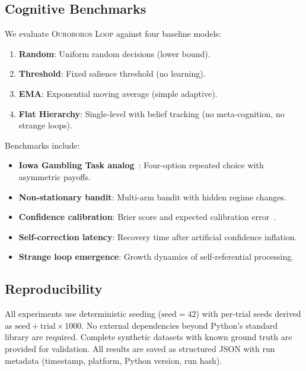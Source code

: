 \documentclass[11pt,a4paper]{article}
\newcommand{\OL}{\textsc{Ouroboros Loop}}
\begin{document}
\subsection{Cognitive Benchmarks}

We evaluate \OL{} against four baseline models:

\begin{enumerate}
  \item \textbf{Random}: Uniform random decisions (lower bound).
  \item \textbf{Threshold}: Fixed salience threshold (no learning).
  \item \textbf{EMA}: Exponential moving average (simple adaptive).
  \item \textbf{Flat Hierarchy}: Single-level with belief tracking
        (no meta-cognition, no strange loops).
\end{enumerate}

Benchmarks include:
\begin{itemize}
  \item \textbf{Iowa Gambling Task analog}~\citep{bechara1994igt}:
        Four-option repeated choice with asymmetric payoffs.
  \item \textbf{Non-stationary bandit}: Multi-arm bandit with hidden
        regime changes.
  \item \textbf{Confidence calibration}: Brier score and expected
        calibration error~\citep{brier1950verification,
        gneiting2007calibration}.
  \item \textbf{Self-correction latency}: Recovery time after
        artificial confidence inflation.
  \item \textbf{Strange loop emergence}: Growth dynamics of
        self-referential processing.
\end{itemize}

\subsection{Reproducibility}

All experiments use deterministic seeding ($\text{seed} = 42$) with
per-trial seeds derived as $\text{seed} + \text{trial} \times 1000$.
No external dependencies beyond Python's standard library are required.
Complete synthetic datasets with known ground truth are provided for
validation. All results are saved as structured JSON with run metadata
(timestamp, platform, Python version, run hash).

\end{document}
